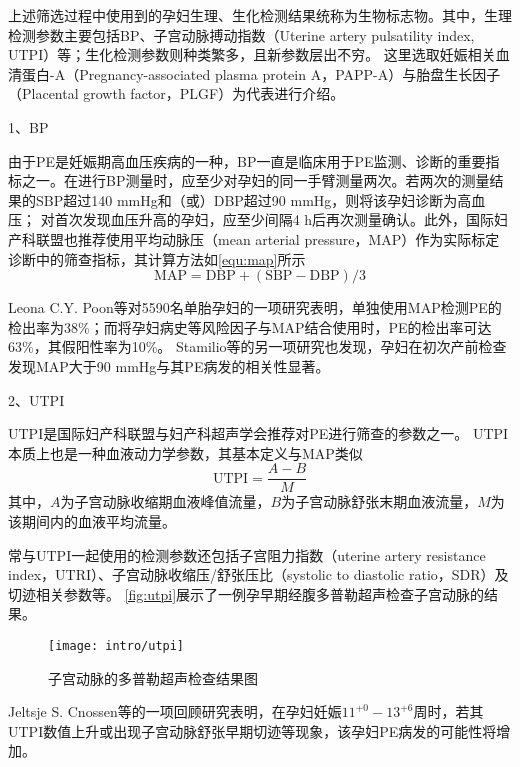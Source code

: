 上述筛选过程中使用到的孕妇生理、生化检测结果统称为生物标志物。其中，生理检测参数主要包括BP、子宫动脉搏动指数（Uterine artery pulsatility index, UTPI）等；生化检测参数则种类繁多，且新参数层出不穷\cite{Rene2008,Zhong2015,Zeisler2016,Rana2012}。
这里选取妊娠相关血清蛋白-A（Pregnancy-associated plasma protein A，PAPP-A）与胎盘生长因子（Placental growth factor，PLGF）为代表进行介绍。

1、BP

由于PE是妊娠期高血压疾病的一种，BP一直是临床用于PE监测、诊断的重要指标之一\cite{OAG9,HDASOM,2000s1}。在进行BP测量时，应至少对孕妇的同一手臂测量两次。若两次的测量结果的SBP超过140 mmHg和（或）DBP超过90 mmHg，则将该孕妇诊断为高血压；
对首次发现血压升高的孕妇，应至少间隔4 h后再次测量确认\cite{OAG9}。此外，国际妇产科联盟也推荐使用平均动脉压（mean arterial pressure，MAP）作为实际标定诊断中的筛查指标\cite{FIGO}，其计算方法如\autoref{equ:map}所示
\begin{equation}
    \label{equ:map}
    \text{MAP}=\text{DBP}+(\text{SBP}-\text{DBP})/3
\end{equation}

Leona C.Y. Poon等\cite{Poon2008}对5590名单胎孕妇的一项研究表明，单独使用MAP检测PE的检出率为38\%；而将孕妇病史等风险因子与MAP结合使用时，PE的检出率可达63\%，其假阳性率为10\%。
Stamilio等\cite{Stamilio2000}的另一项研究也发现，孕妇在初次产前检查发现MAP大于90 mmHg与其PE病发的相关性显著。


2、UTPI

UTPI是国际妇产科联盟与妇产科超声学会推荐对PE进行筛查的参数之一\cite{FIGO,Sotiriadis2019}。
UTPI本质上也是一种血液动力学参数，其基本定义与MAP类似\cite{Cnossen2008}
\begin{equation}
    \label{equ:utpi}
    \text{UTPI}=\frac{A-B}{M}
\end{equation}
其中，$A$为子宫动脉收缩期血液峰值流量，$B$为子宫动脉舒张末期血液流量，$M$为该期间内的血液平均流量。

常与UTPI一起使用的检测参数还包括子宫阻力指数（uterine artery resistance index，UTRI）、子宫动脉收缩压/舒张压比（systolic to diastolic ratio，SDR）及切迹相关参数等\cite{Cnossen2008}。
\autoref{fig:utpi}展示了一例孕早期经腹多普勒超声检查子宫动脉的结果\cite{Sotiriadis2019}。
\begin{figure}[htbp]
    \centering
    \texttt{[image: intro/utpi]}
    \caption{\label{fig:utpi}子宫动脉的多普勒超声检查结果图}
\end{figure}

Jeltsje S. Cnossen等\cite{Cnossen2008}的一项回顾研究表明，在孕妇妊娠$11^{+0}-13^{+6}$周时，若其UTPI数值上升或出现子宫动脉舒张早期切迹等现象，该孕妇PE病发的可能性将增加\cite{OAG9,Plasencia2008}。

